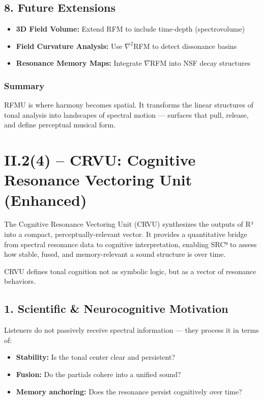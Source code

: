 \subsection*{8. Future Extensions}

\begin{itemize}
    \item \textbf{3D Field Volume:} Extend RFM to include time-depth (spectrovolume)
    \item \textbf{Field Curvature Analysis:} Use $\nabla^2$RFM to detect dissonance basins
    \item \textbf{Resonance Memory Maps:} Integrate $\nabla$RFM into NSF decay structures
\end{itemize}

\subsubsection*{Summary}

RFMU is where harmony becomes spatial. It transforms the linear structures of tonal analysis into landscapes of spectral motion — surfaces that pull, release, and define perceptual musical form.

\section*{II.2(4) – CRVU: Cognitive Resonance Vectoring Unit (Enhanced)}

The Cognitive Resonance Vectoring Unit (CRVU) synthesizes the outputs of R³ into a compact, perceptually-relevant vector. It provides a quantitative bridge from spectral resonance data to cognitive interpretation, enabling SRC⁹ to assess how stable, fused, and memory-relevant a sound structure is over time.

CRVU defines tonal cognition not as symbolic logic, but as a vector of resonance behaviors.

\subsection*{1. Scientific \& Neurocognitive Motivation}

Listeners do not passively receive spectral information — they process it in terms of:

\begin{itemize}
    \item \textbf{Stability:} Is the tonal center clear and persistent?
    \item \textbf{Fusion:} Do the partials cohere into a unified sound?
    \item \textbf{Memory anchoring:} Does the resonance persist cognitively over time?
\end{itemize}

